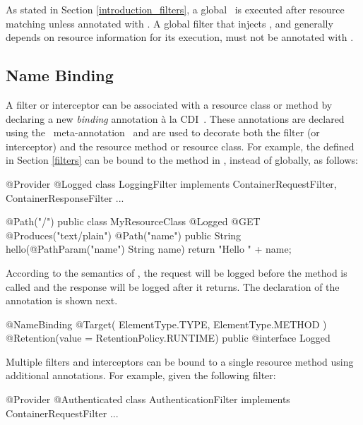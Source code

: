As stated in Section \ref{introduction_filters}, a global \ContainerRequestFilter\ is executed after resource matching unless annotated with \PreMatching. A global filter that injects , and generally depends on resource information for its execution, must not be annotated with \PreMatching.

\subsection{Name Binding}
\label{Name_Binding}

A filter or interceptor can be associated with a resource class or method by declaring a new \emph{binding} annotation \`{a} la CDI~\cite{jsr299}. These annotations are declared using the \jaxrs\ meta-annotation \NameBinding\ and are used to decorate both the filter (or interceptor) and the resource method or resource class. For example, the  defined in Section \ref{filters} can be bound to the method  in , instead of globally, as follows:

\begin{listing}{1}
@Provider
@Logged
class LoggingFilter implements ContainerRequestFilter, 
                               ContainerResponseFilter {
    ...
}
\end{listing}

\begin{listing}{1}
@Path("/")
public class MyResourceClass {
    @Logged
    @GET
    @Produces("text/plain")
    @Path("{name}")
    public String hello(@PathParam("name") String name) {
        return "Hello " + name;
    }
}
\end{listing}

According to the semantics of , the request will be logged before the  method is called and the response will be logged after it returns. The declaration of the  annotation is shown next.

\begin{listing}{1}
@NameBinding
@Target({ ElementType.TYPE, ElementType.METHOD })
@Retention(value = RetentionPolicy.RUNTIME)
public @interface Logged { }
\end{listing}

Multiple filters and interceptors can be bound to a single resource method using additional annotations. For example, given the following filter:

\begin{listing}{1}
@Provider
@Authenticated
class AuthenticationFilter implements ContainerRequestFilter {
    ...
}
\end{listing}

